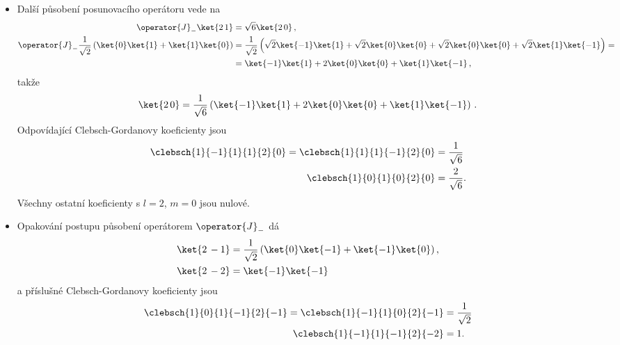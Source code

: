 \begin{solution}
\begin{itemize}
	\item
		Další působení posunovacího operátoru vede na
		\begin{subequations}
			\begin{align}
				\operator{J}_{-}\ket{2\,1}
					&=\sqrt{6}\ket{2\,0}\,,\\
				\operator{J}_{-}\frac{1}{\sqrt{2}}\left(\ket{0}\ket{1}+\ket{1}\ket{0}\right)
					&=\frac{1}{\sqrt{2}}\left(\sqrt{2}\ket{-1}\ket{1}+\sqrt{2}\ket{0}\ket{0}
						+\sqrt{2}\ket{0}\ket{0}+\sqrt{2}\ket{1}\ket{-1}\right)=\nonumber\\
					&=\ket{-1}\ket{1}+2\ket{0}\ket{0}+\ket{1}\ket{-1}\,,
			\end{align}
		\end{subequations}
		takže
		\begin{equation}
			\ket{2\,0}
				=\frac{1}{\sqrt{6}}\left(\ket{-1}\ket{1}+2\ket{0}\ket{0}+\ket{1}\ket{-1}\right)\,.
		\end{equation}
		Odpovídající Clebsch-Gordanovy koeficienty jsou
		\begin{subequations}
			\begin{align}
				\clebsch{1}{-1}{1}{1}{2}{0}
					=\clebsch{1}{1}{1}{-1}{2}{0}
					&=\frac{1}{\sqrt{6}}\\
				\clebsch{1}{0}{1}{0}{2}{0}
					&=\frac{2}{\sqrt{6}}.
			\end{align}
		\end{subequations}
		Všechny ostatní koeficienty s $l=2$, $m=0$ jsou nulové.
	
	\item
		Opakování postupu působení operátorem $\operator{J}_{-}$ dá 
		\begin{subequations}
			\begin{align}
				\ket{2\,-1}
					&=\frac{1}{\sqrt{2}}\left(\ket{0}\ket{-1}+\ket{-1}\ket{0}\right),\\
				\ket{2\,-2}
					&=\ket{-1}\ket{-1}
			\end{align}
		\end{subequations}
		a příslušné Clebsch-Gordanovy koeficienty jsou
		\begin{subequations}
			\begin{align}
				\clebsch{1}{0}{1}{-1}{2}{-1}
					=\clebsch{1}{-1}{1}{0}{2}{-1}
					&=\frac{1}{\sqrt{2}}\\
				\clebsch{1}{-1}{1}{-1}{2}{-2}
					&=1.
			\end{align}
		\end{subequations}
	

\end{itemize}
\end{solution}
